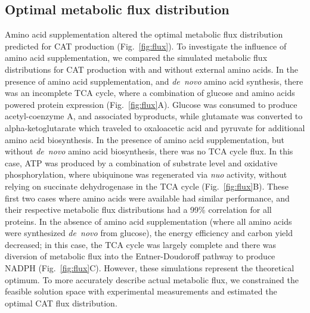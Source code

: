 \documentclass[journal=asbcd6,manuscript=article]{achemso}
\begin{document}
\subsection{Optimal metabolic flux distribution}
Amino acid supplementation altered the optimal metabolic flux distribution predicted for CAT production (Fig.~\ref{fig:flux}).
To investigate the influence of amino acid supplementation, we compared the simulated metabolic flux distributions for CAT production with and without external amino acids.
In the presence of amino acid supplementation, and \textit{de~novo} amino acid synthesis, there was an incomplete TCA cycle, where a combination of glucose and amino acids powered protein expression (Fig.~\ref{fig:flux}A).
Glucose was consumed to produce acetyl-coenzyme A, and associated byproducts, while glutamate was converted to alpha-ketoglutarate which traveled to oxaloacetic acid and pyruvate for additional amino acid biosynthesis.
In the presence of amino acid supplementation, but without \textit{de~novo} amino acid biosynthesis, there was no TCA cycle flux.
In this case, ATP was produced by a combination of substrate level and oxidative phosphorylation, where ubiquinone was regenerated via \textit{nuo} activity, without relying on succinate dehydrogenase in the TCA cycle (Fig.~\ref{fig:flux}B).
These first two cases where amino acids were available had similar performance, and their respective metabolic flux distributions had a 99\% correlation for all proteins.
In the absence of amino acid supplementation (where all amino acids were synthesized \textit{de~novo} from glucose), the energy efficiency and carbon yield decreased; in this case, the TCA cycle was largely complete and there was diversion of metabolic flux into the Entner-Doudoroff pathway to produce NADPH (Fig.~\ref{fig:flux}C).
However, these simulations represent the theoretical optimum.
To more accurately describe actual metabolic flux, we constrained the feasible solution space with experimental measurements and estimated the optimal CAT flux distribution.
\end{document}
